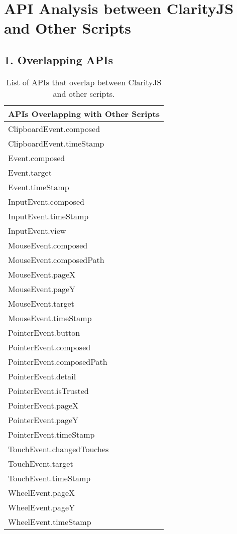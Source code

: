 \documentclass{article}
\begin{document}
\section*{API Analysis between ClarityJS and Other Scripts}

\subsection*{1. Overlapping APIs}

\begin{table}[h]
\centering
\begin{tabular}{|l|}
\hline
\textbf{APIs Overlapping with Other Scripts} \\
\hline
ClipboardEvent.composed \\
ClipboardEvent.timeStamp \\
Event.composed \\
Event.target \\
Event.timeStamp \\
InputEvent.composed \\
InputEvent.timeStamp \\
InputEvent.view \\
MouseEvent.composed \\
MouseEvent.composedPath \\
MouseEvent.pageX \\
MouseEvent.pageY \\
MouseEvent.target \\
MouseEvent.timeStamp \\
PointerEvent.button \\
PointerEvent.composed \\
PointerEvent.composedPath \\
PointerEvent.detail \\
PointerEvent.isTrusted \\
PointerEvent.pageX \\
PointerEvent.pageY \\
PointerEvent.timeStamp \\
TouchEvent.changedTouches \\
TouchEvent.target \\
TouchEvent.timeStamp \\
WheelEvent.pageX \\
WheelEvent.pageY \\
WheelEvent.timeStamp \\

\hline
\end{tabular}
\caption{List of APIs that overlap between ClarityJS and other scripts.}
\end{table}
\end{document}
